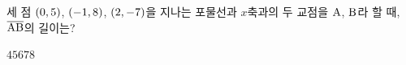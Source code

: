 세 점 $(0{,}\mkern3mu\mathopen{}5)$, $(-1{,}\mkern3mu\mathopen{}8)$, $(2{,}\mkern3mu\mathopen{}-7)$을 지나는 포물선과 $x$축과의 두 교점을 $\mathrm{A}$, $\mathrm{B}$라 할 때, $\overline{\mathrm{AB}}$의 길이는?
\begin{choices32}{$4$}{$5$}{$6$}{$7$}{$8$}\end{choices32}
